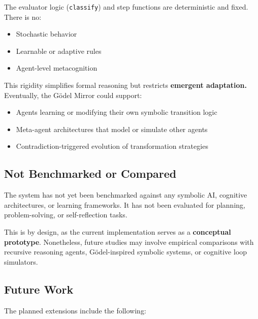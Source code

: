 \documentclass[manuscript,nonacm]{acmart}
\begin{document}
The evaluator logic (\texttt{classify}) and step functions are deterministic and fixed. There is no:

\begin{itemize}
\item Stochastic behavior
\item Learnable or adaptive rules
\item Agent-level metacognition
\end{itemize}

This rigidity simplifies formal reasoning but restricts \textbf{emergent adaptation.} Eventually, the Gödel Mirror could support:

\begin{itemize}
\item Agents learning or modifying their own symbolic transition logic
\item Meta-agent architectures that model or simulate other agents
\item Contradiction-triggered evolution of transformation strategies
\end{itemize}

\subsection{Not Benchmarked or Compared}

The system has not yet been benchmarked against any symbolic AI, cognitive architectures, or learning frameworks. It has not been evaluated for planning, problem-solving, or self-reflection tasks.

This is by design, as the current implementation serves as a \textbf{conceptual prototype}. Nonetheless, future studies may involve empirical comparisons with recursive reasoning agents, Gödel-inspired symbolic systems, or cognitive loop simulators.

\subsection{Future Work}

The planned extensions include the following:
\end{document}
